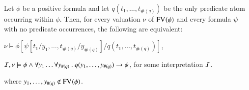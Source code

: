 \documentclass{llncs}
\begin{document}
\begin{proposition}\label{prop:subst}
  Let $\phi$ be a positive formula and let $q(t_1,\ldots,t_{\#(q)})$
  be the only predicate atom occurring within $\phi$. Then, for every
  valuation $\nu$ of $\mathrm{FV}_{}(\phi)$ and every formula $\psi$ with no
  predicate occurrences, the following are
  equivalent: \begin{compactenum}
  \item\label{it1:prop:subst} $\nu \models \phi[\psi[t_1/y_1, \ldots,
      t_{\#(q)}/y_{\#(q)}]/q(t_1,\ldots,t_{\#(q)})]$, 
  \item\label{it2:prop:subst} $\mathcal{I},\nu \models \phi \wedge \forall y_1
    \ldots \forall y_{\#(q)} ~.~ q(y_1,\ldots,y_{\#(q)}) \rightarrow
    \psi$, for some interpretation $\mathcal{I}$.
  \end{compactenum}
  where $y_1,\ldots,y_{\#(q)} \not\in \mathrm{FV}_{}(\phi)$. 
\end{proposition}
\end{document}
